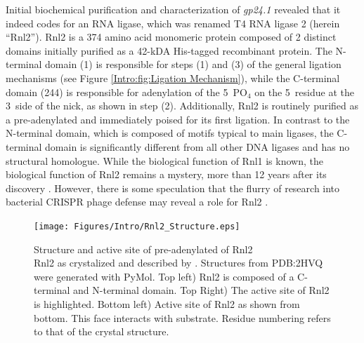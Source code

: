     Initial biochemical purification and characterization of \textit{gp24.1} \citep{Ho2002b} revealed that it indeed codes for an RNA ligase, which was renamed T4 RNA ligase 2 (herein ``Rnl2''). Rnl2 is a 374 amino acid monomeric protein composed of 2 distinct domains initially purified as a 42-kDA His-tagged recombinant protein. The N-terminal domain (1) is responsible for steps (1) and (3) of the general ligation mechanisms (see Figure \ref{Intro:fig:Ligation Mechanism}), while the C-terminal domain (244) is responsible for adenylation of the 5\textprime~PO$_{4}$ on the 5\textprime~residue at the 3\textprime~side of the nick, as shown in step (2). Additionally, Rnl2 is routinely purified as a pre-adenylated and immediately poised for its first ligation. In contrast to the N-terminal domain, which is composed of motifs typical to main ligases, the C-terminal domain is significantly  different from all other DNA ligases and has no structural homologue. While the biological function of Rnl1 is known, the biological function of Rnl2 remains a mystery, more than 12 years after its discovery \citep{Chauleau2013b}. However, there is some speculation that the flurry of research into bacterial CRISPR phage defense may reveal a role for Rnl2 \citep{Barrangou2007c,Chauleau2013b}.

    \begin{figure} %
      \centering 
      \texttt{[image: Figures/Intro/Rnl2\_Structure.eps]}
      \caption[Structure and active site of pre-adenylated of Rnl2]
      {
        Structure and active site of pre-adenylated of Rnl2\\[0.25cm]
        Rnl2 as crystalized and described by \citep{Nandakumar2006}. Structures from PDB:2HVQ were generated with PyMol. Top left) Rnl2 is composed of a C-terminal and N-terminal domain. Top Right) The active site of Rnl2 is highlighted. Bottom left) Active site of Rnl2 as shown from bottom. This face interacts with substrate. Residue numbering refers to that of the crystal structure.
        }
      \label{Intro:fig:Rnl2 General Structure}
      \end{figure}

